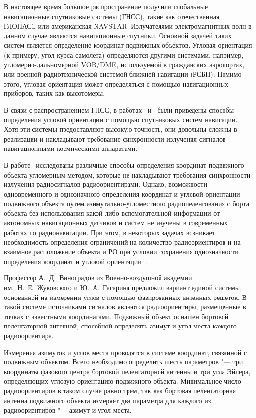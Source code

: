 \documentclass[../main.tex]{subfiles}
\begin{document}
В настоящее время большое распространение получили глобальные навигационные спутниковые системы (ГНСС), такие как отечественная ГЛОНАСС или американская NAVSTAR. Излучателями электромагнитных волн в данном случае являются навигационные спутники. Основной задачей таких систем является определение координат подвижных объектов. Угловая ориентация (к примеру, угол курса самолета) определяются другими системами, например, угломерно-дальномерной VOR/DME, используемой в гражданских аэропортах, или военной радиотехнической системой ближней навигации (РСБН). Помимо этого, угловая ориентация может определяться с помощью навигационных приборов, таких как высотомеры.

В связи с распространением ГНСС, в работах~\cite{KORNEV:2016} и~\cite{STEPANOV:2006} были приведены способы определения угловой ориентации с помощью спутниковых систем навигации. Хотя эти системы предоставляют высокую точность, они довольны сложны в реализации и накладывают требование синхронности излучения сигналов навигационными космическими аппаратами.

В работе~\cite{BBELAVIN:1977} исследованы различные способы определения координат подвижного объекта угломерным методом, которые не накладывают требования синхронности излучения радиосигналов радиоориентирами. Однако, возможности одновременного и однозначного определения координат и угловой ориентации подвижного объекта путем азимутально-угломестного радиопеленгования с борта объекта без использования какой-либо вспомогательной информации от автономных навигационных датчиков и систем не изучены в современных работах по радионавигации. При этом, в некоторых задачах возникает необходимость определения ограничений на количество радиоориентиров и на взаимное расположение объекта и РО при условии сохранения однозначности определения координат и угловой ориентации~\cite{VINOGRADOV:2016}.

Профессор А.~Д.~Виноградов из Военно-воздушной академии им.~Н.~Е.~Жуковского и Ю.~А.~Гагарина предложил вариант единой системы, основанной на измерении углов с помощью фазированных антенных решеток. В такой системе источниками сигналов являются радиоориентиры, размещенные в точках с известными координатами. Подвижный объект оснащен бортовой пеленгаторной антенной, способной определять азимут и угол места каждого радиоориентира.

Измерения азимутов и углов места проводятся в системе координат, связанной с подвижным объектом. Всего необходимо определить шесть параметров "--- три координаты фазового центра бортовой пеленгаторной антенны и три угла Эйлера, определяющих угловую ориентацию подвижного объекта. Минимальное число радиоориентиров в таком случае равно трем, так как бортовая пеленгаторная антенна подвижного объекта измеряет два параметра для каждого из радиоориентиров "--- азимут и угол места.
\end{document}
